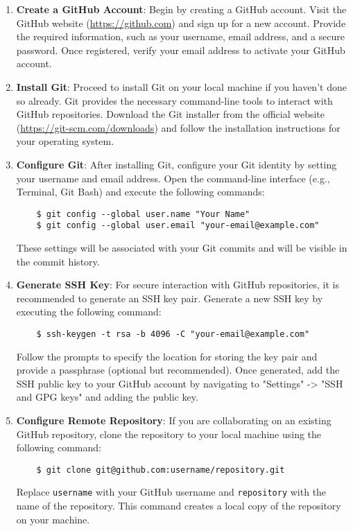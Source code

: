 \begin{enumerate}
    \item \textbf{Create a GitHub Account}: Begin by creating a GitHub account. Visit the GitHub website (\url{https://github.com}) and sign up for a new account. Provide the required information, such as your username, email address, and a secure password. Once registered, verify your email address to activate your GitHub account.
    
    \item \textbf{Install Git}: Proceed to install Git on your local machine if you haven't done so already. Git provides the necessary command-line tools to interact with GitHub repositories. Download the Git installer from the official website (\url{https://git-scm.com/downloads}) and follow the installation instructions for your operating system.
    
    \item \textbf{Configure Git}: After installing Git, configure your Git identity by setting your username and email address. Open the command-line interface (e.g., Terminal, Git Bash) and execute the following commands:
    
    \begin{verbatim}
    $ git config --global user.name "Your Name"
    $ git config --global user.email "your-email@example.com"
    \end{verbatim}
    
    These settings will be associated with your Git commits and will be visible in the commit history.
    
    \item \textbf{Generate SSH Key}: For secure interaction with GitHub repositories, it is recommended to generate an SSH key pair. Generate a new SSH key by executing the following command:
    
    \begin{verbatim}
    $ ssh-keygen -t rsa -b 4096 -C "your-email@example.com"
    \end{verbatim}
    
    Follow the prompts to specify the location for storing the key pair and provide a passphrase (optional but recommended). Once generated, add the SSH public key to your GitHub account by navigating to "Settings" -> "SSH and GPG keys" and adding the public key.
    
    \item \textbf{Configure Remote Repository}: If you are collaborating on an existing GitHub repository, clone the repository to your local machine using the following command:
    
    \begin{verbatim}
    $ git clone git@github.com:username/repository.git
    \end{verbatim}
    
    Replace \texttt{username} with your GitHub username and \texttt{repository} with the name of the repository. This command creates a local copy of the repository on your machine.
\end{enumerate}

